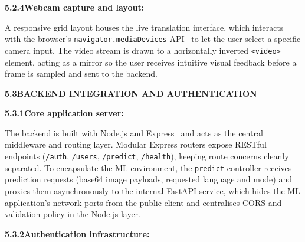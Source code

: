 \noindent\textbf{5.2.4\quad Webcam capture and layout:}\par
{}
\vspace{0.2cm}

\noindent A responsive grid layout houses the live translation interface, which interacts with the browser's \texttt{navigator.mediaDevices} API~\cite{w3c2023html} to let the user select a specific camera input. The video stream is drawn to a horizontally inverted \texttt{<video>} element, acting as a mirror so the user receives intuitive visual feedback before a frame is sampled and sent to the backend.\par\vspace{0.3cm}

\noindent\textbf{5.3\quad BACKEND INTEGRATION AND AUTHENTICATION}\par
{}
\vspace{0.2cm}

\noindent\textbf{5.3.1\quad Core application server:}\par
{}
\vspace{0.2cm}

\noindent The backend is built with Node.js and Express~\cite{nodejs2024,expressjs2024} and acts as the central middleware and routing layer. Modular Express routers expose RESTful endpoints (\texttt{/auth}, \texttt{/users}, \texttt{/predict}, \texttt{/health}), keeping route concerns cleanly separated. To encapsulate the ML environment, the \texttt{predict} controller receives prediction requests (base64 image payloads, requested language and mode) and proxies them asynchronously to the internal FastAPI service, which hides the ML application's network ports from the public client and centralises CORS and validation policy in the Node.js layer.\par\vspace{0.2cm}

\noindent\textbf{5.3.2\quad Authentication infrastructure:}\par
{}
\vspace{0.2cm}


